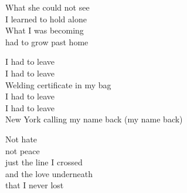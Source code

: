 \begin{lyrics}
What she could not see\\
I learned to hold alone\\
What I was becoming\\
had to grow past home

I had to leave\\
I had to leave\\
Welding certificate in my bag\\
I had to leave\\
I had to leave\\
New York calling my name back (my name back)

Not hate\\
not peace\\
just the line I crossed\\
and the love underneath\\
that I never lost
\end{lyrics}

